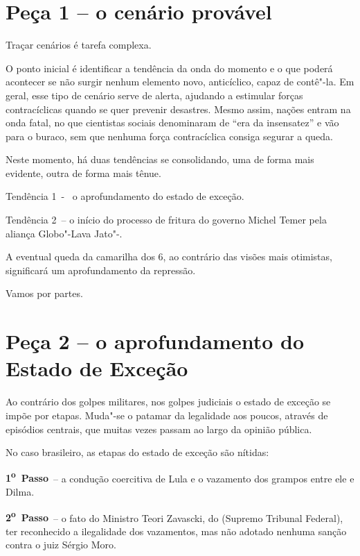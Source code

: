  

\section{Peça 1 -- o cenário provável}

Traçar cenários é tarefa complexa.

O ponto inicial é identificar a tendência da onda do momento e o que
poderá acontecer se não surgir nenhum elemento novo, anticíclico, capaz
de contê"-la. Em geral, esse tipo de cenário serve de alerta, ajudando a
estimular forças contracíclicas quando se quer prevenir desastres. Mesmo
assim, nações entram na onda fatal, no que cientistas sociais
denominaram de ``era da insensatez'' e vão para o buraco, sem que
nenhuma força contracíclica consiga segurar a queda.

Neste momento, há duas tendências se consolidando, uma de forma mais
evidente, outra de forma mais tênue.

Tendência 1~- ~o aprofundamento do estado de exceção.

Tendência 2~-- o início do processo de fritura do governo Michel Temer
pela aliança Globo"-Lava Jato"-.

A eventual queda da camarilha dos 6, ao contrário das visões mais
otimistas, significará um aprofundamento da repressão.

Vamos por partes.

\section{Peça 2 -- o aprofundamento do Estado de Exceção}

Ao contrário dos golpes militares, nos golpes judiciais o estado de
exceção se impõe por etapas. Muda"-se o patamar da legalidade aos poucos,
através de episódios centrais, que muitas vezes passam ao largo da
opinião pública.

No caso brasileiro, as etapas do estado de exceção são nítidas:

\textbf{1\textsuperscript{o}~Passo}~-- a condução coercitiva de Lula e o
vazamento dos grampos entre ele e Dilma.

\textbf{2\textsuperscript{o}~Passo}~-- o fato do Ministro Teori
Zavascki, do  (Supremo Tribunal Federal), ter reconhecido a
ilegalidade dos vazamentos, mas não adotado nenhuma sanção contra o juiz
Sérgio Moro.

